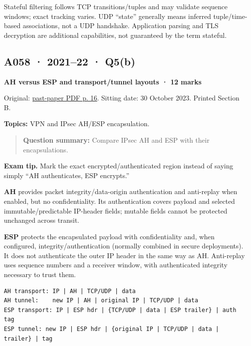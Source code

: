 \documentclass[11pt,a4paper]{article}
\begin{document}
Stateful filtering follows TCP transitions/\allowbreak{}tuples and may validate sequence windows; exact tracking varies. UDP “state” generally means inferred tuple/\allowbreak{}time-based associations,\allowbreak{} not a UDP handshake. Application parsing and TLS decryption are additional capabilities,\allowbreak{} not guaranteed by the term stateful.




\clearpage
\subsection{A058 · 2021–22 · Q5(b)}\label{a058}

\textbf{AH versus ESP and transport/\allowbreak{}tunnel layouts · 12 marks}


Original: \href{../../CSE405-Security_Merged.pdf\#page=16}{past-paper PDF p. 16}. Sitting date: 30 October 2023. Printed Section B.


\textbf{Topics:} VPN and IPsec AH/\allowbreak{}ESP encapsulation.



\begin{quote}\small

\textbf{Question summary:} Compare IPsec AH and ESP with their encapsulations.



\end{quote}


{\color{ForestGreen}\textbf{Exam tip.} Mark the exact encrypted/\allowbreak{}authenticated region instead of saying simply “AH authenticates,\allowbreak{} ESP encrypts.”}


\textbf{AH} provides packet integrity/\allowbreak{}data-origin authentication and anti-replay when enabled,\allowbreak{} but no confidentiality. Its authentication covers payload and selected immutable/\allowbreak{}predictable IP-header fields; mutable fields cannot be protected unchanged across transit.


\textbf{ESP} protects the encapsulated payload with confidentiality and,\allowbreak{} when configured,\allowbreak{} integrity/\allowbreak{}authentication (normally combined in secure deployments). It does not authenticate the outer IP header in the same way as AH. Anti-replay uses sequence numbers and a receiver window,\allowbreak{} with authenticated integrity necessary to trust them.



\begin{Verbatim}[breaklines=true,breakanywhere=true,fontsize=\small,frame=single,rulecolor=\color{PanelBorder}]
AH transport: IP | AH | TCP/UDP | data
AH tunnel:    new IP | AH | original IP | TCP/UDP | data
ESP transport: IP | ESP hdr | {TCP/UDP | data | ESP trailer} | auth tag
ESP tunnel: new IP | ESP hdr | {original IP | TCP/UDP | data | trailer} | tag
\end{Verbatim}
\end{document}
